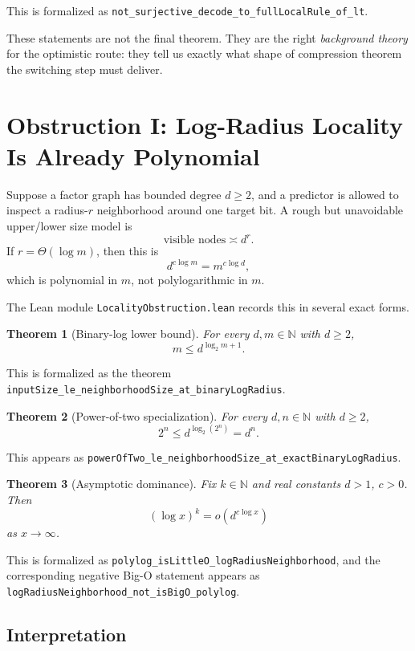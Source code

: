 \documentclass[11pt]{article}
\newtheorem{theorem}{Theorem}[section]
\theoremstyle{remark}
\begin{document}
\noindent
This is formalized as
\texttt{not\_surjective\_decode\_to\_fullLocalRule\_of\_lt}.

These statements are not the final theorem.  They are the right \emph{background theory} for
the optimistic route: they tell us exactly what shape of compression theorem the switching
step must deliver.

\section{Obstruction I: Log-Radius Locality Is Already Polynomial}

Suppose a factor graph has bounded degree $d \ge 2$, and a predictor is allowed to inspect a
radius-$r$ neighborhood around one target bit.  A rough but unavoidable upper/lower size model is
\[
  \text{visible nodes} \asymp d^r.
\]
If $r = \Theta(\log m)$, then this is
\[
  d^{c \log m} = m^{c \log d},
\]
which is polynomial in $m$, not polylogarithmic in $m$.

The Lean module \texttt{LocalityObstruction.lean} records this in several exact forms.

\begin{theorem}[Binary-log lower bound]
For every $d,m \in \mathbb{N}$ with $d \ge 2$,
\[
  m \le d^{\log_2 m + 1}.
\]
\end{theorem}

\noindent
This is formalized as the theorem
\texttt{inputSize\_le\_neighborhoodSize\_at\_binaryLogRadius}.

\begin{theorem}[Power-of-two specialization]
For every $d,n \in \mathbb{N}$ with $d \ge 2$,
\[
  2^n \le d^{\log_2(2^n)} = d^n.
\]
\end{theorem}

\noindent
This appears as
\texttt{powerOfTwo\_le\_neighborhoodSize\_at\_exactBinaryLogRadius}.

\begin{theorem}[Asymptotic dominance]
Fix $k \in \mathbb{N}$ and real constants $d>1$, $c>0$.  Then
\[
  (\log x)^k = o\!\left(d^{c \log x}\right)
\]
as $x \to \infty$.
\end{theorem}

\noindent
This is formalized as
\texttt{polylog\_isLittleO\_logRadiusNeighborhood}, and the corresponding negative
Big-O statement appears as
\texttt{logRadiusNeighborhood\_not\_isBigO\_polylog}.

\subsection{Interpretation}
\end{document}
